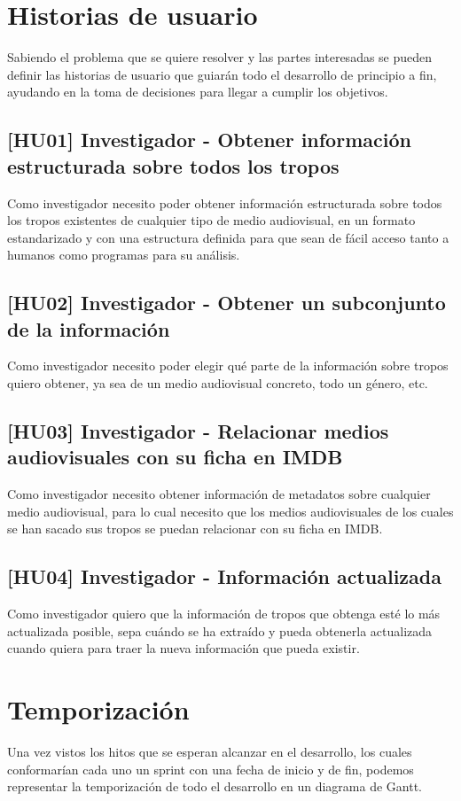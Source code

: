 \section{Historias de usuario}
Sabiendo el problema que se quiere resolver y las partes interesadas se pueden
definir las historias de usuario que guiarán todo el desarrollo de principio a
fin, ayudando en la toma de decisiones para llegar a cumplir los objetivos.

\subsection{[HU01] Investigador - Obtener información estructurada sobre todos los tropos}
Como investigador necesito poder obtener información estructurada sobre todos
los tropos existentes de cualquier tipo de medio audiovisual, en un formato
estandarizado y con una estructura definida para que sean de fácil acceso tanto
a humanos como programas para su análisis.

\subsection{[HU02] Investigador - Obtener un subconjunto de la información}
Como investigador necesito poder elegir qué parte de la información sobre tropos
quiero obtener, ya sea de un medio audiovisual concreto, todo un género, etc.

\subsection{[HU03] Investigador - Relacionar medios audiovisuales con su ficha en IMDB}
Como investigador necesito obtener información de metadatos sobre cualquier
medio audiovisual, para lo cual necesito que los medios audiovisuales de los
cuales se han sacado sus tropos se puedan relacionar con su ficha en IMDB.

\subsection{[HU04] Investigador - Información actualizada}
Como investigador quiero que la información de tropos que obtenga esté lo más
actualizada posible, sepa cuándo se ha extraído y pueda obtenerla actualizada
cuando quiera para traer la nueva información que pueda existir.

\section{Temporización}
Una vez vistos los hitos que se esperan alcanzar en el desarrollo, los cuales
conformarían cada uno un sprint con una fecha de inicio y de fin, podemos
representar la temporización de todo el desarrollo en un diagrama de Gantt.

